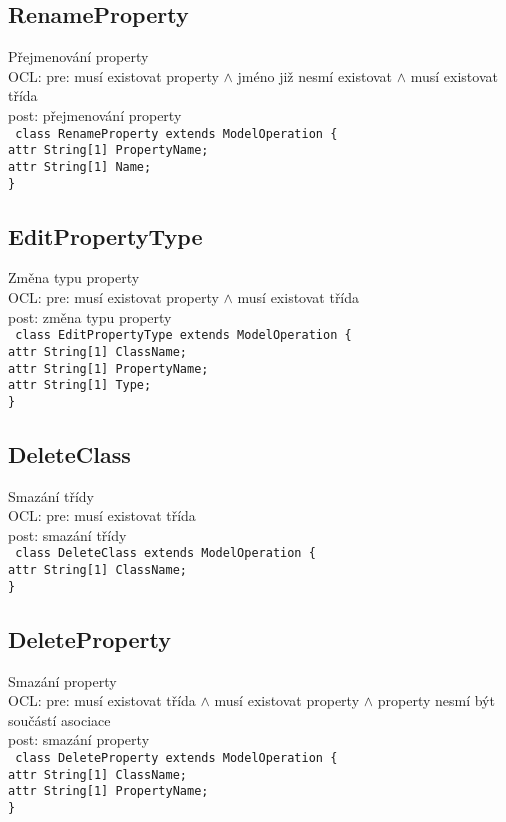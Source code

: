 \documentclass[11pt,a4paper]{article}
\begin{document}
	\subsection{RenameProperty}
	Přejmenování property \\
	OCL: pre: musí existovat property $\wedge$ jméno již nesmí existovat $\wedge$ musí existovat třída \\
	post: přejmenování property \\
	\texttt{
    class RenameProperty extends ModelOperation \{ \\
      attr String[1] PropertyName; \\
      attr String[1] Name; \\
    \}
	}
	\subsection{EditPropertyType}
	Změna typu property \\
	OCL: pre: musí existovat property $\wedge$ musí existovat třída \\
	post: změna typu property \\
	\texttt{
    class EditPropertyType extends ModelOperation \{ \\
      attr String[1] ClassName;\\
      attr String[1] PropertyName;\\
      attr String[1] Type;\\
    \}
	}
	\subsection{DeleteClass}
	Smazání třídy \\
	OCL: pre: musí existovat třída \\
	post: smazání třídy \\
	\texttt{
    class DeleteClass extends ModelOperation \{ \\
      attr String[1] ClassName;\\
    \}
	}
	\subsection{DeleteProperty}
	Smazání property \\
	OCL: pre: musí existovat třída $\wedge$ musí existovat property $\wedge$ property nesmí být součástí asociace \\
	post: smazání property \\
	\texttt{
    class DeleteProperty extends ModelOperation \{ \\
      attr String[1] ClassName; \\
      attr String[1] PropertyName; \\
    \}
	}
\end{document}
